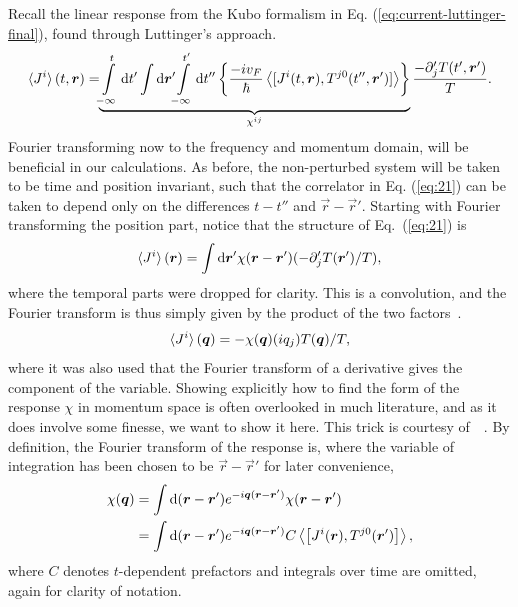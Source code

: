 Recall the linear response from the Kubo formalism in Eq. (\ref{eq:current-luttinger-final}), found through Luttinger's approach.
\begin{equation}
  \label{eq:21}
  \braket{J^i}(t, \vec{r}) = \!\!
  \underbrace{
    \int\limits_{-\infty }^{t} \mathrm{d}t'
    \int \mathrm{d}\vec{r}' \!\!
  \int\limits_{-\infty }^{t'} \mathrm{d}t''
  \left\{
    \frac{-i v_F}{\hbar }
    \Braket{
      [J^i(t, \vec{r}), T^{j 0} (t'', \vec{r}')]
    }
  \right\}
  }_{\chi^{ij}}
  \frac{- \partial _j' T(t', \vec{r}')}{T}.
\end{equation}
Fourier transforming now to the frequency and momentum domain, will be beneficial in our calculations.
As before, the non-perturbed system will be taken to be time and position invariant, such that the correlator in Eq. (\ref{eq:21}) can be taken to depend only on the differences $t-t''$ and $\vec{r} - \vec{r}' $.
Starting with Fourier transforming the position part, notice that the structure of Eq.~(\ref{eq:21}) is
\[
  \braket{J^i}(\vec{r}) = \int \mathrm{d} \vec{r}' \chi (\vec{r} - \vec{r}') (-\partial _j' T(\vec{r}') /T),
\]
where the temporal parts were dropped for clarity.
This is a convolution, and the Fourier transform is thus simply given by the product of the two factors~\cite{rottmannMatematiskFormelsamling1995}.
\begin{equation}
  \braket{J^i}(\vec{q}) = -
  \chi (\vec{q}) (iq_j) T(\vec{q}) /T,
\end{equation}
where it was also used that the Fourier transform of a derivative gives the component of the variable.
Showing explicitly how to find the form of the response $\chi $ in momentum space is often overlooked in much literature, and as it does involve some finesse, we want to show it here.
This trick is courtesy of~\citeauthor{changLectureNotesManybody2018}~\cite{changLectureNotesManybody2018}.
By definition, the Fourier transform of the response is, where the variable of integration has been chosen to be $\vec{r}-\vec{r}'$ for later convenience,
\begin{align}
  \chi (\vec{q}) &= \int \mathrm{d}(\vec{r} - \vec{r}') e^{-i\vec{q}(\vec{r}-\vec{r}')} \chi (\vec{r} - \vec{r}')\\
                 &= \int \mathrm{d}(\vec{r} - \vec{r}') e^{-i\vec{q}(\vec{r}-\vec{r}')} C \Braket{
                   \left[
J^i (\vec{r}), T^{j 0}(\vec{r}')
                   \right]},\\
\end{align}
where $C$ denotes $t$-dependent prefactors and integrals over time are omitted, again for clarity of notation.
